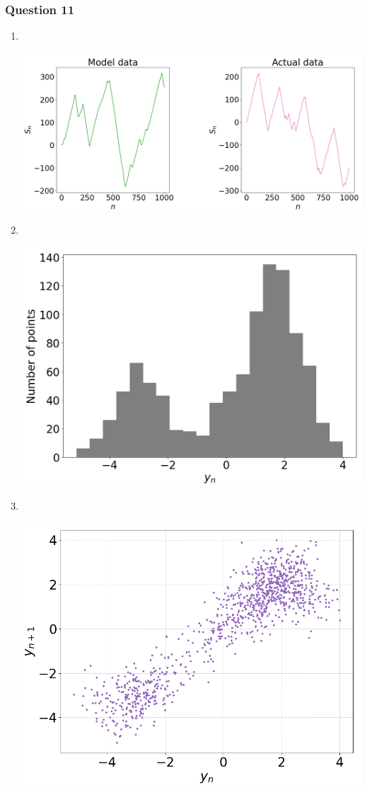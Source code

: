 \documentclass[12pt, a4paper]{article}
\begin{document}
\subsubsection*{Question 11}

\begin{enumerate}[label=(\roman*)]
	\item $~~~~~~~~$
	\begin{minipage}{\textwidth}
		\includegraphics[width = 0.9\linewidth]{q11_fig1}
		\label{q11_fig1}
	\end{minipage}
	\item $~~~~~~~~$
	\begin{minipage}{\textwidth}
		\includegraphics[width = 0.6\linewidth]{q11_fig2}
		\label{q11_fig2}
	\end{minipage}
	\item $~~~~~~~~$
	\begin{minipage}{\textwidth}
		\includegraphics[width = 0.6\linewidth]{q11_fig3}
		\label{q11_fig3}
	\end{minipage}
\end{enumerate}
\end{document}
